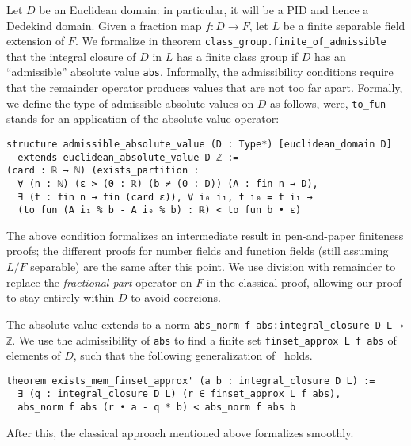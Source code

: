 \documentclass[a4paper,USenglish,cleveref, autoref, thm-restate]{lipics-v2021}
\newcommand{\lean}[1]{\texttt{#1}\xspace} %
\begin{document}
Let $D$ be an Euclidean domain: in particular, it will be a PID and hence a Dedekind domain. Given a fraction map $f \colon D \to F$, let $L$ be a finite separable field extension of $F$. We formalize in theorem \lean{class\_group.finite\_of\_admissible} that the integral closure of $D$ in $L$ has a finite class group if $D$ has an ``admissible'' absolute value \lean{abs}.
Informally, the admissibility conditions require that the remainder operator produces values that are not too far apart.
Formally, we define the type of admissible absolute values on $D$ as follows, were, \lean{to\_fun} stands for an application of the absolute value operator:
\begin{lstlisting}
structure admissible_absolute_value (D : Type*) [euclidean_domain D]
  extends euclidean_absolute_value D ℤ :=
(card : ℝ → ℕ) (exists_partition :
  ∀ (n : ℕ) (ε > (0 : ℝ) (b ≠ (0 : D)) (A : fin n → D),
  ∃ (t : fin n → fin (card ε)), ∀ i₀ i₁, t i₀ = t i₁ →
  (to_fun (A i₁ % b - A i₀ % b) : ℝ) < to_fun b • ε)
\end{lstlisting}

The above condition formalizes an intermediate result in pen-and-paper finiteness proofs;
the different proofs for number fields and function fields (still assuming $L/F$ separable) are the same after this point.
We use division with remainder to replace the \emph{fractional part} operator on $F$ in the classical proof,
allowing our proof to stay entirely within $D$ to avoid coercions.

The absolute value extends to a norm \lean{abs\_norm f abs:integral\_closure D L → ℤ}.
We use the admissibility of \lean{abs} to find a finite set \lean{finset\_approx L f abs} of elements of $D$,
such that the following generalization of~\cite[Theorem~12.2.1]{Ireland-Rosen} holds.
\begin{lstlisting}
theorem exists_mem_finset_approx' (a b : integral_closure D L) :=
  ∃ (q : integral_closure D L) (r ∈ finset_approx L f abs),
  abs_norm f abs (r • a - q * b) < abs_norm f abs b
\end{lstlisting}
After this, the classical approach mentioned above formalizes smoothly.
\end{document}
